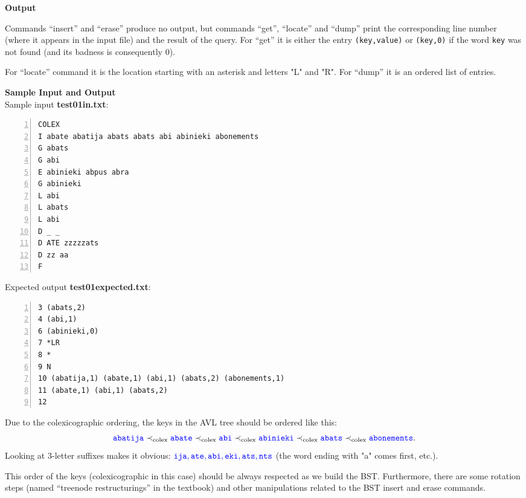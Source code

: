 \documentclass[11pt]{article}
\begin{document}
\vspace{20pt}
{\bf \large Output}

Commands ``insert'' and ``erase'' produce no output, but commands ``get'', ``locate'' and ``dump'' 
print the corresponding line number (where it appears in the input file) and the result of the query. 
For ``get'' it is either the entry {\tt (key,value)} or {\tt (key,0)} \textendash{} if the word {\tt key} 
was not found (and its badness is consequently $0$). 

For ``locate'' command it is the location starting
with an asterisk and letters "L" and "R". For ``dump'' it is an ordered list of entries. 


\newpage
\vspace{20pt}
{\bf \large Sample Input and Output}\\



Sample input {\bf test01in.txt}:
\begin{Verbatim}[frame=single,numbers=left]
COLEX
I abate abatija abats abats abi abinieki abonements
G abats
G abi
E abinieki abpus abra
G abinieki
L abi
L abats
L abi
D _ _
D ATE zzzzzats
D zz aa
F
\end{Verbatim}

\vspace{5pt}
Expected output {\bf test01expected.txt}:
\begin{Verbatim}[frame=single,numbers=left]
3 (abats,2)
4 (abi,1)
6 (abinieki,0)
7 *LR
8 *
9 N
10 (abatija,1) (abate,1) (abi,1) (abats,2) (abonements,1)
11 (abate,1) (abi,1) (abats,2)
12 
\end{Verbatim}

Due to the colexicographic ordering, the keys in the AVL tree should be ordered like this: 
$$\textcolor{blue}{\mathtt{abatija}} \prec_{\text{colex}} \textcolor{blue}{\mathtt{abate}} 
\prec_{\text{colex}} \textcolor{blue}{\mathtt{abi}} \prec_{\text{colex}} \textcolor{blue}{\mathtt{abinieki}}
\prec_{\text{colex}} \textcolor{blue}{\mathtt{abats}} \prec_{\text{colex}} \textcolor{blue}{\mathtt{abonements}}.$$
Looking at 3-letter suffixes makes it obvious: $\textcolor{blue}{\mathtt{ija,ate,abi,eki,ats,nts}}$
(the word ending with "a" comes first, etc.).

This order of the keys (colexicographic in this case) should be always respected 
as we build the BST. Furthermore, there are some rotation steps 
(named ``treenode restructurings'' in the textbook)
and other manipulations related to the BST insert and erase commands. 
\end{document}
